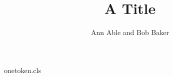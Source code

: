 \begin{filecontents*}[overwrite]{onetoken.cls}
\newcommand{\address}[1]{\par{\itshape Addr: #1}\par}
\def\emailprefix{E-mail: }
\def\email#1{\vspace*{5pt}\expandafter\address\expandafter{\emailprefix #1}}
\def\affil#1{\let\x\address\x{Aff: #1}}
\def\thanksaddr{\@ifnextchar[\address\@gobble}
\def\institute#1{\ifx\address\relax(none)\else\address{Inst: #1}\fi}
\end{filecontents*}
\documentclass{onetoken}

\title{A Title}
\author{Ann Able and Bob Baker}
Write to us,  until 2030,  then  and \thanksaddr[Lab D] end.
\maketitle
Body.

